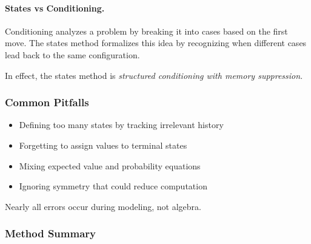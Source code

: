 \documentclass[12pt]{extarticle}
\begin{document}
\paragraph{States vs Conditioning.}
Conditioning analyzes a problem by breaking it into cases based on the first move. The states method formalizes this idea by recognizing when different cases lead back to the same configuration.

In effect, the states method is \emph{structured conditioning with memory suppression}.

\subsubsection*{Common Pitfalls}

\begin{itemize}
    \item Defining too many states by tracking irrelevant history
    \item Forgetting to assign values to terminal states
    \item Mixing expected value and probability equations
    \item Ignoring symmetry that could reduce computation
\end{itemize}

Nearly all errors occur during modeling, not algebra.

\subsubsection*{Method Summary}

\begin{center}
\end{center}
\end{document}
